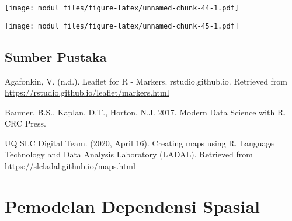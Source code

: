 \documentclass[
]{book}
\newenvironment{Shaded}{\begin{snugshade}}{\end{snugshade}}
\newcommand{\AttributeTok}[1]{\textcolor[rgb]{0.77,0.63,0.00}{#1}}
\newcommand{\DecValTok}[1]{\textcolor[rgb]{0.00,0.00,0.81}{#1}}
\newcommand{\FunctionTok}[1]{\textcolor[rgb]{0.00,0.00,0.00}{#1}}
\newcommand{\NormalTok}[1]{#1}
\newcommand{\OtherTok}[1]{\textcolor[rgb]{0.56,0.35,0.01}{#1}}
\newcommand{\SpecialCharTok}[1]{\textcolor[rgb]{0.00,0.00,0.00}{#1}}
\newcommand{\StringTok}[1]{\textcolor[rgb]{0.31,0.60,0.02}{#1}}
\begin{document}
\begin{Shaded}
\end{Shaded}

\texttt{[image: modul\_files/figure-latex/unnamed-chunk-44-1.pdf]}

\begin{Shaded}
\end{Shaded}

\texttt{[image: modul\_files/figure-latex/unnamed-chunk-45-1.pdf]}

\hypertarget{sumber-pustaka}{%
\section{Sumber Pustaka}\label{sumber-pustaka}}

Agafonkin, V. (n.d.). Leaflet for R - Markers. rstudio.github.io. Retrieved from \url{https://rstudio.github.io/leaflet/markers.html}

Baumer, B.S., Kaplan, D.T., Horton, N.J. 2017. Modern Data Science with R. CRC Press.

UQ SLC Digital Team. (2020, April 16). Creating maps using R. Language Technology and Data Analysis Laboratory (LADAL). Retrieved from \url{https://slcladal.github.io/maps.html}

\hypertarget{pemodelan-dependensi-spasial}{%
\chapter{Pemodelan Dependensi Spasial}\label{pemodelan-dependensi-spasial}}
\end{document}
